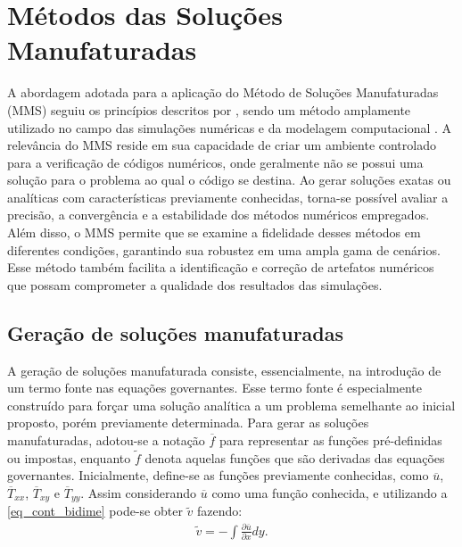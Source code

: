 \chapter[MMS]{Métodos das Soluções Manufaturadas}
\label{Cap_MetodosSolucoesManufaturadas}

A abordagem adotada para a aplicação do Método de Soluções Manufaturadas (MMS) seguiu os princípios descritos por , sendo um método amplamente utilizado no campo das simulações numéricas e da modelagem computacional \cite{Roy2004, Roy2001, Roache2002}. A relevância do MMS reside em sua capacidade de criar um ambiente controlado para a verificação de códigos numéricos, onde geralmente não se possui uma solução para o problema ao qual o código se destina. Ao gerar soluções exatas ou analíticas com características previamente conhecidas, torna-se possível avaliar a precisão, a convergência e a estabilidade dos métodos numéricos empregados. Além disso, o MMS permite que se examine a fidelidade desses métodos em diferentes condições, garantindo sua robustez em uma ampla gama de cenários. Esse método também facilita a identificação e correção de artefatos numéricos que possam comprometer a qualidade dos resultados das simulações.

\section{Geração de soluções manufaturadas}\label{Sec_geracao_solucoes_manufaturadas}

A geração de soluções manufaturada consiste, essencialmente, na introdução de um termo fonte nas equações governantes. Esse termo fonte é especialmente construído para forçar uma solução analítica a um problema semelhante ao inicial proposto, porém previamente determinada. Para gerar as soluções manufaturadas, adotou-se a notação $\overline{f}$ para representar as funções pré-definidas ou impostas, enquanto $\widetilde{f}$ denota aquelas funções que são derivadas das equações governantes. Inicialmente, define-se as funções previamente conhecidas, como $\overline{u}$, $\overline{T}_{xx}$, $\overline{T}_{xy}$ e $\overline{T}_{yy}$. Assim considerando $\overline{u}$ como uma função conhecida, e utilizando a \autoref{eq_cont_bidime} pode-se obter $\widetilde{v}$ fazendo:
\begin{gather}
    \widetilde{v} = - \int \frac{\partial \overline{u}}{\partial x}dy.\label{eq_MMS_v_linha}
\end{gather}

